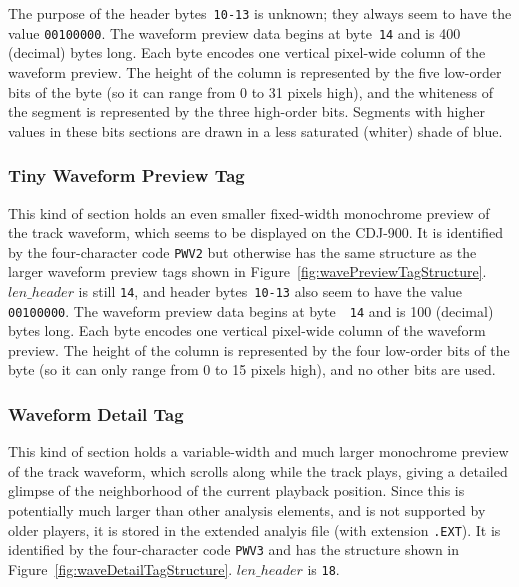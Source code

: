 \documentclass[11pt]{article}
\begin{document}
The purpose of the header bytes~{\tt 10-13} is unknown; they always
seem to have the value {\tt 00100000}. The waveform preview data
begins at byte~{\tt 14} and is 400 (decimal) bytes long. Each byte
encodes one vertical pixel-wide column of the waveform preview. The
height of the column is represented by the five low-order bits of the
byte (so it can range from 0 to 31 pixels high), and the whiteness of
the segment is represented by the three high-order bits. Segments with
higher values in these bits sections are drawn in a less saturated
(whiter) shade of blue.

\subsubsection{Tiny Waveform Preview Tag}

This kind of section holds an even smaller fixed-width monochrome
preview of the track waveform, which seems to be displayed on the
CDJ-900. It is identified by the four-character code {\tt PWV2} but
otherwise has the same structure as the larger waveform preview tags
shown in Figure~\ref{fig:wavePreviewTagStructure}. $len\_header$ is
still {\tt 14}, and header bytes~{\tt 10-13} also seem to have the
value {\tt 00100000}. The waveform preview data begins at byte~{\tt
  14} and is 100 (decimal) bytes long. Each byte encodes one vertical
pixel-wide column of the waveform preview. The height of the column is
represented by the four low-order bits of the byte (so it can only
range from 0 to 15 pixels high), and no other bits are used.

\subsubsection{Waveform Detail Tag}

This kind of section holds a variable-width and much larger monochrome
preview of the track waveform, which scrolls along while the track
plays, giving a detailed glimpse of the neighborhood of the current
playback position. Since this is potentially much larger than other
analysis elements, and is not supported by older players, it is stored
in the extended analyis file (with extension {\tt .EXT}). It is
identified by the four-character code {\tt PWV3} and has the structure
shown in Figure~\ref{fig:waveDetailTagStructure}. $len\_header$ is
{\tt 18}.
\end{document}
